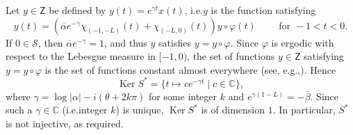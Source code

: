 \documentclass[10pt]{amsart}
\providecommand{\eg}{}
\renewcommand{\eg}{e.g.,\xspace}
\theoremstyle{plain}
\theoremstyle{definition}
\DeclareMathOperator{\Ker}{Ker}
\newcommand{\abs}[1]{\left\lvert #1\right \rvert}
\providecommand{\ie}{i.e.}\providecommand{\etc}{etc.}\providecommand{\resp}{resp.}\providecommand{\cf}{cf.}
\begin{document}
Let $y \in \mathsf Z$ be defined by $y(t) = e^{\gamma t} x(t)$, \ie $y$ is the function satisfying
\begin{equation}
\label{FixedPointV}
y(t) = \left(\overline\alpha e^{-\gamma} \chi_{(-1, -L)}(t) + \chi_{(-L, 0)}(t)\right) y \circ \varphi(t) \qquad \text{ for } -1 < t < 0.
\end{equation}
If $0 \in \mathcal S$, then $\overline\alpha e^{-\gamma} = 1$, and thus $y$ satisfies $y = y \circ \varphi$. Since $\varphi$ is ergodic with respect to the Lebesgue measure in $[-1, 0)$, the set of functions $y \in \mathsf Z$ satisfying $y = y \circ \varphi$ is the set of functions constant almost everywhere (see, \eg \cite[Chap.\,II, Prop.\,2.1]{Mane1987Ergodic}). Hence
\begin{equation}
\label{EqKerS}
\Ker S^\ast = \{t \mapsto c e^{-\gamma t} \mid c \in \mathbb C\},
\end{equation}
where $\gamma = \log\abs{\alpha} - i (\theta + 2 k \pi)$ for some integer $k$ and $e^{\gamma(1 - L)} = - \overline\beta$. Since such a $\gamma \in \mathbb C$ (\ie integer $k$) is unique, $\Ker S^\ast$ is of dimension $1$. In particular, $S^\ast$ is not injective, as required.
\end{document}
